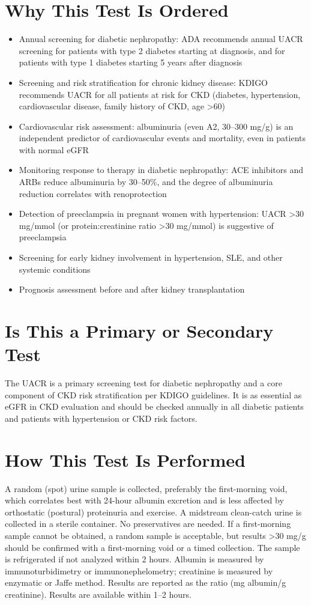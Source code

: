 \section*{Why This Test Is Ordered}
\begin{itemize}
  \item Annual screening for diabetic nephropathy: ADA recommends annual UACR screening for patients with type 2 diabetes starting at diagnosis, and for patients with type 1 diabetes starting 5 years after diagnosis
  \item Screening and risk stratification for chronic kidney disease: KDIGO recommends UACR for all patients at risk for CKD (diabetes, hypertension, cardiovascular disease, family history of CKD, age >60)
  \item Cardiovascular risk assessment: albuminuria (even A2, 30--300 mg/g) is an independent predictor of cardiovascular events and mortality, even in patients with normal eGFR
  \item Monitoring response to therapy in diabetic nephropathy: ACE inhibitors and ARBs reduce albuminuria by 30--50\%, and the degree of albuminuria reduction correlates with renoprotection
  \item Detection of preeclampsia in pregnant women with hypertension: UACR >30 mg/mmol (or protein:creatinine ratio >30 mg/mmol) is suggestive of preeclampsia
  \item Screening for early kidney involvement in hypertension, SLE, and other systemic conditions
  \item Prognosis assessment before and after kidney transplantation
\end{itemize}

\section*{Is This a Primary or Secondary Test}
The UACR is a primary screening test for diabetic nephropathy and a core component of CKD risk stratification per KDIGO guidelines. It is as essential as eGFR in CKD evaluation and should be checked annually in all diabetic patients and patients with hypertension or CKD risk factors.

\section*{How This Test Is Performed}
A random (spot) urine sample is collected, preferably the first-morning void, which correlates best with 24-hour albumin excretion and is less affected by orthostatic (postural) proteinuria and exercise. A midstream clean-catch urine is collected in a sterile container. No preservatives are needed. If a first-morning sample cannot be obtained, a random sample is acceptable, but results >30 mg/g should be confirmed with a first-morning void or a timed collection. The sample is refrigerated if not analyzed within 2 hours. Albumin is measured by immunoturbidimetry or immunonephelometry; creatinine is measured by enzymatic or Jaffe method. Results are reported as the ratio (mg albumin/g creatinine). Results are available within 1--2 hours.

